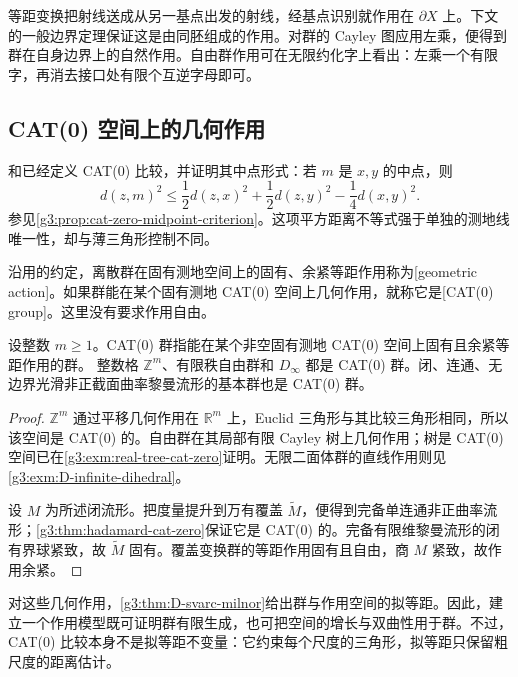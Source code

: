 等距变换把射线送成从另一基点出发的射线，经基点识别就作用在 \(\partial X\) 上。下文的一般边界定理保证这是由同胚组成的作用。对群的 Cayley 图应用左乘，便得到群在自身边界上的自然作用。自由群作用可在无限约化字上看出：左乘一个有限字，再消去接口处有限个互逆字母即可。

\subsection{CAT(0) 空间上的几何作用}
\label{g3:subsec:D03:04}

和已经定义 CAT(0) 比较，并证明其中点形式：若 \(m\) 是 \(x,y\) 的中点，则
\begin{equation}\label{g3:eq:D-cat-midpoint}
	d(z,m)^2\le\frac12d(z,x)^2+\frac12d(z,y)^2-\frac14d(x,y)^2.
\end{equation}
参见\cref{g3:prop:cat-zero-midpoint-criterion}。这项平方距离不等式强于单独的测地线唯一性，却与薄三角形控制不同。

\ProseParagraphBreak

沿用的约定，离散群在固有测地空间上的固有、余紧等距作用称为[geometric action]。如果群能在某个固有测地 CAT(0) 空间上几何作用，就称它是[CAT(0) group]。这里没有要求作用自由。

\begin{proposition}\label{g3:prop:D-cat-action-models}
	设整数 \(m\ge1\)。CAT(0) 群指能在某个非空固有测地 CAT(0) 空间上固有且余紧等距作用的群。
	整数格 \(\mathbb Z^m\)、有限秩自由群和 \(D_\infty\) 都是 CAT(0) 群。闭、连通、无边界光滑非正截面曲率黎曼流形的基本群也是 CAT(0) 群。
\end{proposition}
\begin{proof}
	\(\mathbb Z^m\) 通过平移几何作用在 \(\mathbb R^m\) 上，Euclid 三角形与其比较三角形相同，所以该空间是 CAT(0) 的。自由群在其局部有限 Cayley 树上几何作用；树是 CAT(0) 空间已在\cref{g3:exm:real-tree-cat-zero}证明。无限二面体群的直线作用则见\cref{g3:exm:D-infinite-dihedral}。

	设 \(M\) 为所述闭流形。把度量提升到万有覆盖 \(\widetilde M\)，便得到完备单连通非正曲率流形；\cref{g3:thm:hadamard-cat-zero}保证它是 CAT(0) 的。完备有限维黎曼流形的闭有界球紧致，故 \(\widetilde M\) 固有。覆盖变换群的等距作用固有且自由，商 \(M\) 紧致，故作用余紧。
\end{proof}

对这些几何作用，\cref{g3:thm:D-svarc-milnor}给出群与作用空间的拟等距。因此，建立一个作用模型既可证明群有限生成，也可把空间的增长与双曲性用于群。不过，CAT(0) 比较本身不是拟等距不变量：它约束每个尺度的三角形，拟等距只保留粗尺度的距离估计。

